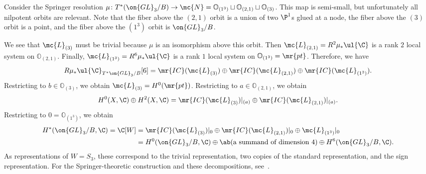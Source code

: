 \begin{exm}
    Consider the Springer resolution \(\mu \colon T^*(\on{GL}_3/B) \to \mc{N} = \mathbb{O}_{(1^3)} \sqcup \mathbb{O}_{(2,1)} \sqcup \mathbb{O}_{(3)}\). This map is semi-small, but unfortunately all nilpotent orbits are relevant. Note that the fiber above the \((2,1)\) orbit is a union of two \(\P^1\)s glued at a node, the fiber above the \((3)\) orbit is a point, and the fiber above the \((1^3)\) orbit is \(\on{GL}_3/B\).

    We see that \(\mc{L}_{(3)}\) must be trivial because \(\mu\) is an isomorphism above this orbit. Then \(\mc{L}_{(2,1)} = R^2 \mu_* \ul{\C}\) is a rank \(2\) local system on \(\mathbb{O}_{(2,1)}\). Finally, \(\mc{L}_{(1^3)} = R^6 \mu_* \ul{\C}\) is a rank \(1\) local system on \(\mathbb{O}_{(1^3)} = \mr{pt}\). Therefore, we have
    \[ R \mu_* \ul{\C}_{T^*\on{GL}_3/B}[6] = \mr{IC}(\mc{L}_{(3)}) \oplus \mr{IC}(\mc{L}_{(2,1)}) \oplus \mr{IC}(\mc{L}_{(1^3)}). \]
    Restricting to \(b \in \mathbb{O}_{(3)}\), we obtain \(\mc{L}_{(3)} = H^0(\mr{pt})\). Restricting to \(a \in \mathbb{O}_{(2,1)}\), we obtain
    \[ H^0(X, \C) \oplus H^2(X, \C) = \mr{IC}(\mc{L}_{(3)})|_{(a)} \oplus \mr{IC}(\mc{L}_{(2,1)})|_{(a)}. \]
    Restricting to \(0 = \mathbb{O}_{(1^3)}\), we obtain
    \begin{align*}
        H^*(\on{GL}_3/B, \C) = \C[W] &= \mr{IC}(\mc{L}_{(3)})|_0 \oplus \mr{IC}(\mc{L}_{(2,1)})|_0 \oplus \mc{L}_{(1^3)}|_0 \\
        &= H^0(\on{GL}_3/B, \C) \oplus \ab(\text{a summand of dimension } 4) \oplus H^6(\on{GL}_3/B, \C).
    \end{align*}
    As representations of \(W = S_3\), these correspond to the trivial representation, two copies of the standard representation, and the sign representation. For the Springer-theoretic construction and these decompositions, see~\cite{BorhoMacPherson1983}.
\end{exm}

